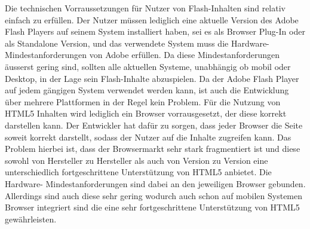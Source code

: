 Die technischen Vorraussetzungen für Nutzer von Flash-Inhalten sind relativ
einfach zu erfüllen. Der Nutzer müssen lediglich eine aktuelle Version des
Adobe Flash Players auf seinem System installiert haben, sei es als Browser
Plug-In oder als Standalone Version, und das verwendete System muss die
Hardware-Mindestanforderungen von Adobe erfüllen. Da diese
Mindestanforderungen äusserst gering sind, sollten alle aktuellen Systeme,
unabhängig ob mobil oder Desktop, in der Lage sein Flash-Inhalte abzuspielen.
Da der Adobe Flash Player auf jedem gängigen System verwendet werden kann,
ist auch die Entwicklung über mehrere Plattformen in der Regel kein Problem.
\newline\newline
Für die Nutzung von HTML5 Inhalten wird lediglich ein Browser vorrausgesetzt,
der diese korrekt darstellen kann. Der Entwickler hat dafür zu
sorgen, dass jeder Browser die Seite soweit korrekt darstellt, sodass der
Nutzer auf die Inhalte zugreifen kann. Das Problem hierbei ist, dass der
Browsermarkt sehr stark fragmentiert ist und diese sowohl von Hersteller zu
Hersteller als auch von Version zu Version eine unterschiedlich
fortgeschrittene Unterstützung von HTML5 anbietet. Die Hardware-
Mindestanforderungen sind dabei an den jeweiligen Browser gebunden. Allerdings
sind auch diese sehr gering wodurch auch schon auf mobilen Systemen Browser
integriert sind die eine sehr fortgeschrittene Unterstützung von HTML5
gewährleisten.

